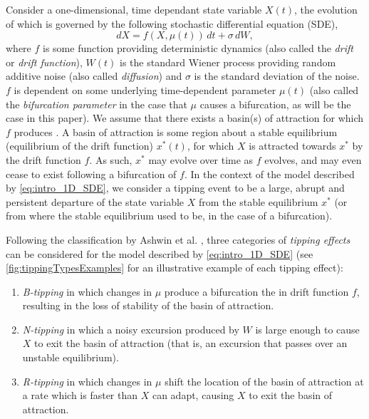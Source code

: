 \documentclass[11pt]{amsart}
\begin{document}
Consider a one-dimensional, time dependant state variable $X(t)$, the evolution of which is governed by the following stochastic differential equation (SDE),
\begin{equation}
    \label{eq:intro_1D_SDE}
    dX = f(X,\mu(t))\,dt + \sigma \,dW,
\end{equation}
where $f$ is some function providing deterministic dynamics (also called the \emph{drift} or \emph{drift function}), $W(t)$ is the standard Wiener process providing random additive noise (also called \emph{diffusion}) and $\sigma$ is the standard deviation of the noise. $f$ is dependent on some underlying time-dependent parameter $\mu(t)$ (also called the \emph{bifurcation parameter} in the case that $\mu$ causes a bifurcation, as will be the case in this paper). We assume that there exists a basin(s) of attraction for which $f$ produces . A basin of attraction is some region about a stable equilibrium (equilibrium of the drift function) $x^*(t)$, for which $X$ is attracted towards $x^*$ by the drift function $f$. As such, $x^*$ may evolve over time as $f$ evolves, and may even cease to exist following a bifurcation of $f$. In the context of the model described by \cref{eq:intro_1D_SDE}, we consider a tipping event to be a large, abrupt and persistent departure of the state variable $X$ from the stable equilibrium $x^*$ (or from where the stable equilibrium used to be, in the case of a bifurcation).

Following the classification by Ashwin et al. \cite{ashwin_2012_tipping_points}, three categories of \emph{tipping effects} can be considered for the model described by \cref{eq:intro_1D_SDE} (see \cref{fig:tippingTypesExamples} for an illustrative example of each tipping effect): 
\begin{enumerate}
    \item \emph{B-tipping} in which changes in $\mu$ produce a bifurcation the in drift function $f$, resulting in the loss of stability of the basin of attraction.
    \item \emph{N-tipping} in which a noisy excursion produced by $W$ is large enough to cause $X$ to exit the basin of attraction (that is, an excursion that passes over an unstable equilibrium).
    \item \emph{R-tipping} in which changes in $\mu$ shift the location of the basin of attraction at a rate which is faster than $X$ can adapt, causing $X$ to exit the basin of attraction.
\end{enumerate}
\end{document}
